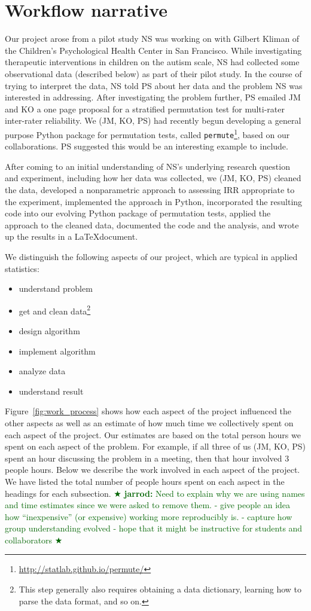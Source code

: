 \documentclass[]{article}
\newcommand{\jarrod}[1] { \textcolor{darkgreen} {
\ensuremath{\bigstar} {\bf jarrod:}  {#1}
\ensuremath{\bigstar} } }
\begin{document}
\section{Workflow narrative}\label{workflow-narrative}

Our project arose from a pilot study NS was working on with Gilbert Kliman of
the Children's Psychological Health Center in San Francisco.
While investigating therapeutic interventions in children on the autism scale,
NS had collected some observational data (described below) as part of their
pilot study.
In the course of trying to interpret the data, NS told PS about her data and
the problem NS was interested in addressing.
After investigating the problem further, PS emailed JM and KO a one page
proposal for a stratified permutation test for multi-rater inter-rater
reliability.
We (JM, KO, PS) had recently begun developing a general purpose Python package
for permutation tests, called
\texttt{permute}\footnote{\url{http://statlab.github.io/permute/}},
based on our collaborations.
PS suggested this would be an interesting example to include.

After coming to an initial understanding of NS's underlying research question
and experiment, including how her data was collected, we (JM, KO, PS) 
cleaned the data, developed a nonparametric approach to assessing IRR
appropriate to the experiment, implemented the approach in Python, incorporated
the resulting code into our evolving Python package of permutation tests,
applied the approach to the cleaned data, documented the code and the analysis,
and wrote up the results in a \LaTeX document. 

We distinguish the following aspects of our project, which are typical in
applied statistics:
\begin{itemize}
    \item understand problem
    \item get and clean data\footnote{
        This step generally also requires obtaining a data dictionary, learning
        how to parse the data format, and so on.
        }
    \item design algorithm
    \item implement algorithm
    \item analyze data
    \item understand result
\end{itemize}
Figure~\ref{fig:work_process} shows how each aspect of the
project influenced the other aspects as well as an estimate of how much time
we collectively spent on each aspect of the project.
Our estimates are based on the total person hours we spent on each aspect of
the problem.
For example, if all three of us (JM, KO, PS) spent an hour discussing the
problem in a meeting, then that hour involved 3 people hours.
Below we describe the work involved in each aspect of the project.
We have listed the total number of people hours spent on each aspect in the
headings for each subsection.
\jarrod{Need to explain why we are using names and time estimates since
we were asked to remove them.
- give people an idea how ``inexpensive'' (or expensive) working more
  reproducibly is.
- capture how group understanding evolved
- hope that it might be instructive for students and collaborators
}
\end{document}
